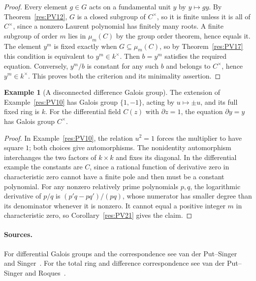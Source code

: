 \documentclass[11pt,oneside,openany]{book}
\theoremstyle{definition}
\newtheorem{example}[theorem]{Example}
\theoremstyle{remark}
\begin{document}
\begin{proof}
Every element \(g\in G\) acts on a fundamental unit \(y\) by
\(y\mapsto gy\). By Theorem~\ref{res:PV12}, \(G\) is a
closed subgroup of \(C^\times\), so it is finite unless it is
all of \(C^\times\), since a nonzero Laurent polynomial has
finitely many roots. A finite subgroup of order \(m\) lies
in \(\mu_m(C)\) by the group order theorem, hence equals it.
The element \(y^m\) is fixed exactly when \(G\subseteq\mu_m(C)\),
so by Theorem~\ref{res:PV17} this condition is equivalent to
\(y^m\in k^\times\). Then \(b=y^m\) satisfies the required
equation. Conversely, \(y^m/b\) is constant for any such
\(b\) and belongs to \(C^\times\), hence \(y^m\in k^\times\).
This proves both the criterion and its minimality assertion.
\end{proof}

\begin{example}[A disconnected difference Galois group]
\label{res:PV22}
The extension of Example~\ref{res:PV10} has Galois group
\(\{1,-1\}\), acting by \(u\mapsto\pm u\), and its full fixed
ring is \(k\). For the differential field \(C(z)\) with
\(\partial z=1\), the equation \(\partial y=y\) has Galois
group \(C^\times\).
\end{example}

\begin{proof}
In Example~\ref{res:PV10}, the relation \(u^2=1\) forces the
multiplier to have square \(1\); both choices give
automorphisms. The nonidentity automorphism interchanges the
two factors of \(k\times k\) and fixes its diagonal.
In the differential example the constants are \(C\), since
a rational function of derivative zero in characteristic zero
cannot have a finite pole and then must be a constant polynomial.
For any nonzero relatively prime polynomials \(p,q\), the
logarithmic derivative of \(p/q\) is
\((p'q-pq')/(pq)\), whose numerator has smaller degree than
its denominator whenever it is nonzero. It cannot equal
a positive integer \(m\) in characteristic zero, so
Corollary~\ref{res:PV21} gives the claim.
\end{proof}

\paragraph{Sources.}
For differential Galois groups and the correspondence see
van der Put--Singer~\cite[Chapter 1, Section 1.4]{vps-differential}
and Singer~\cite[Sections 1.3 and 1.5]{singer}. For the total
ring and difference correspondence see van der Put--Singer
\cite[Chapter 1, Sections 1.2--1.3]{vps-difference} and
Roques~\cite[Sections 5.2--8]{roques}.
\end{document}
